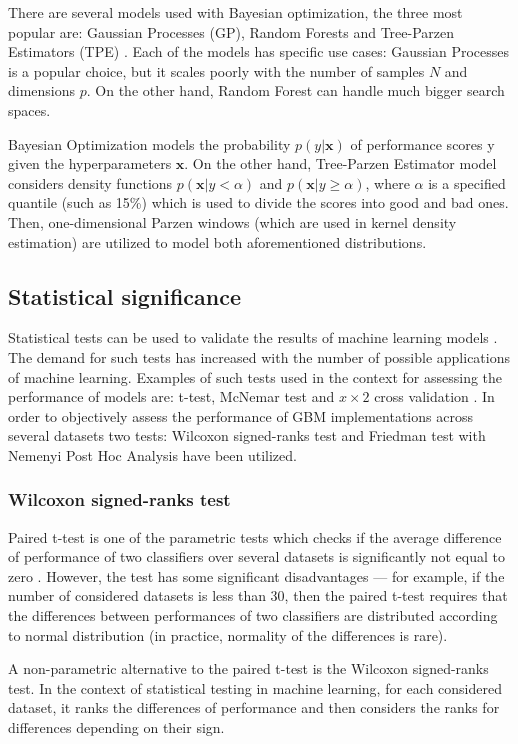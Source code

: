 \documentclass[magisterska, english]{pwr_wmat_praca_dyplomowa}
\theoremstyle{plain}
\numberwithin{theorem}{chapter}
\theoremstyle{definition}
\numberwithin{theorem}{chapter}
\begin{document}
There are several models used with Bayesian optimization, the three most popular are: Gaussian Processes (GP), Random Forests and Tree-Parzen Estimators (TPE) \cite{hyperboost}. Each of the models has specific use cases: Gaussian Processes is a popular choice, but it scales poorly with the number of samples $N$ and dimensions $p$. On the other hand, Random Forest can handle much bigger search spaces.

Bayesian Optimization models the probability
$p(y|\mathbf{x})$ of performance scores y given the hyperparameters $\mathbf{x}$. On the other hand, Tree-Parzen Estimator model considers density
functions $p(\mathbf{x}|y < \alpha)$ and $p(\mathbf{x}|y\ge\alpha)$, where $\alpha$ is a specified quantile (such as 15\%) which is used to divide the scores into good and bad ones. Then, one-dimensional Parzen windows (which are used in kernel density estimation) are utilized to model both aforementioned distributions. 

\subsection{Statistical significance}
Statistical tests can be used to validate the results of machine learning models \cite{demsar}. The demand for such tests has increased with the number of possible applications of machine learning. Examples of such tests used in the context for assessing the performance of models are: t-test, McNemar test and $x\times2$ cross validation \cite{demsar}.
In order to objectively assess the performance of GBM implementations across several datasets two tests: Wilcoxon signed-ranks test and Friedman test with Nemenyi Post Hoc Analysis have been utilized. 

\subsubsection{Wilcoxon signed-ranks test}
Paired t-test is one of the parametric tests which checks if the average difference of performance of two classifiers over several datasets is significantly not equal to zero \cite{demsar}. However, the test has some significant disadvantages --- for example, if the number of considered datasets is less than 30, then the paired t-test requires that the differences between performances of two classifiers are distributed according to normal distribution (in practice, normality of the differences is rare). 

A non-parametric alternative to the paired t-test is the Wilcoxon signed-ranks test. In the context of statistical testing in machine learning, for each considered dataset, it ranks the differences of performance and then considers the ranks for differences depending on their sign.
\end{document}

